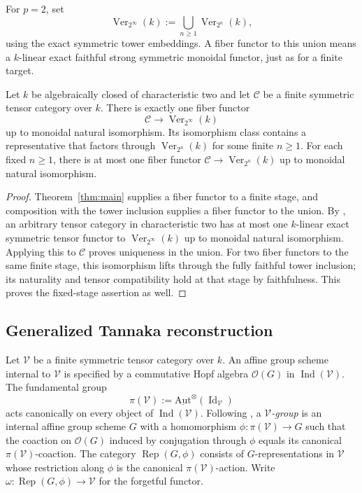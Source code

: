 For $p=2$, set
\[
 \operatorname{Ver}_{2^\infty}(k)
 :=\bigcup_{n\ge1}\operatorname{Ver}_{2^n}(k),
\]
using the exact symmetric tower embeddings. A fiber functor to this union
means a $k$-linear exact faithful strong symmetric monoidal functor, just
as for a finite target.

\begin{corollary}
\label{cor:characteristic-two-uniqueness}
Let $k$ be algebraically closed of characteristic two and let
$\mathcal C$ be a finite symmetric tensor category over $k$. There is
exactly one fiber functor
\[
 \mathcal C\longrightarrow\operatorname{Ver}_{2^\infty}(k)
\]
up to monoidal natural isomorphism. Its isomorphism class contains a
representative that factors through $\operatorname{Ver}_{2^n}(k)$ for
some finite $n\ge1$. For each fixed $n\ge1$, there is at most one
fiber functor $\mathcal C\to\operatorname{Ver}_{2^n}(k)$ up to
monoidal natural isomorphism.
\end{corollary}

\begin{proof}
Theorem~\ref{thm:main} supplies a fiber functor to a finite stage, and
composition with the tower inclusion supplies a fiber functor to the
union. By \cite[Theorem~9.4.1]{CoulembierEtingofOstrikIncompressible},
an arbitrary tensor category in characteristic two has at most one
$k$-linear exact symmetric tensor functor to
$\operatorname{Ver}_{2^\infty}(k)$ up to monoidal natural isomorphism.
Applying this to $\mathcal C$ proves uniqueness in the union.
For two fiber functors to the same finite stage, this isomorphism lifts
through the fully faithful tower inclusion; its naturality and tensor
compatibility hold at that stage by faithfulness. This proves the
fixed-stage assertion as well.
\end{proof}

\subsection{Generalized Tannaka reconstruction}

Let $\mathcal V$ be a finite symmetric tensor category over $k$.
An affine group scheme internal to $\mathcal V$ is specified by a
commutative Hopf algebra $\mathcal O(G)$ in
$\operatorname{Ind}(\mathcal V)$. The fundamental group
\[
 \pi(\mathcal V)
 :=\underline{\mathrm{Aut}}^{\otimes}(\operatorname{Id}_{\mathcal V})
\]
acts canonically on every object of $\operatorname{Ind}(\mathcal V)$.
Following \cite[Sections~4.1.1--4.1.4]{CoulembierEtingofOstrikIncompressible},
a \emph{$\mathcal V$-group} is an internal affine group scheme $G$ with
a homomorphism $\phi:\pi(\mathcal V)\to G$ such that the coaction on
$\mathcal O(G)$ induced by conjugation through $\phi$ equals its canonical
$\pi(\mathcal V)$-coaction. The category $\operatorname{Rep}(G,\phi)$
consists of $G$-representations in $\mathcal V$ whose restriction along
$\phi$ is the canonical $\pi(\mathcal V)$-action. Write
$\omega:\operatorname{Rep}(G,\phi)\to\mathcal V$ for the forgetful functor.

